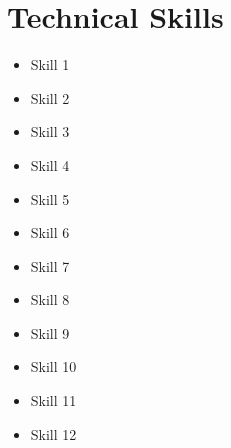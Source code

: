 \section{\faBug \hspace{0.1cm} Technical Skills}
        \begin{multicols}{3}
            \begin{itemize}[itemsep=-3pt, parsep=3pt]
                \item\small Skill 1
                \item Skill 2
                \item Skill 3
                \item Skill 4
                \item Skill 5
                \item Skill 6
                \item Skill 7
                \item Skill 8
                \item Skill 9
                \item Skill 10
                \item Skill 11
                \item Skill 12
            \end{itemize}
        \end{multicols}
        \vspace*{2.0\multicolsep}

\vspace{1pt}